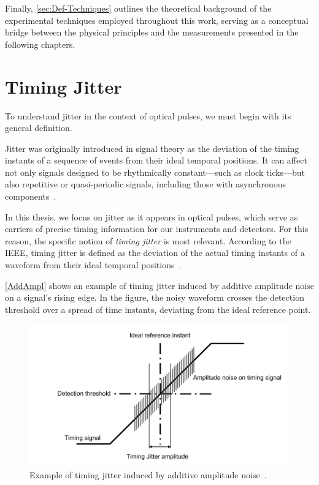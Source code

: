 Finally, \autoref{sec:Def-Techniques} outlines the theoretical background of the experimental techniques employed throughout this work, serving as a conceptual bridge between the physical principles and the measurements presented in the following chapters.

\section{Timing Jitter}
\label{Sec:Def-Jitter}

To understand jitter in the context of optical pulses, we must begin with its general definition.

Jitter was originally introduced in signal theory as the deviation of the timing instants of a sequence of events from their ideal temporal positions. It can affect not only signals designed to be rhythmically constant—such as clock ticks—but also repetitive or quasi-periodic signals, including those with asynchronous components~\cite{General_IEEE}.

In this thesis, we focus on jitter as it appears in optical pulses, which serve as carriers of precise timing information for our instruments and detectors. For this reason, the specific notion of \emph{timing jitter} is most relevant. According to the IEEE, timing jitter is defined as the deviation of the actual timing instants of a waveform from their ideal temporal positions~\cite{General_IEEE}.

\autoref{AddAmpl} shows an example of timing jitter induced by additive amplitude noise on a signal’s rising edge. In the figure, the noisy waveform crosses the detection threshold over a spread of time instants, deviating from the ideal reference point.



\begin{figure}[hbtp]
\centering
\includegraphics[width=1\textwidth]{AmplitudeAdditiveNoise}
\caption{Example of timing jitter induced by additive amplitude noise~\cite{General_IEEE}.}
\label{AddAmpl}
\end{figure}

